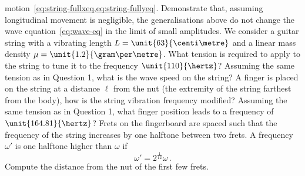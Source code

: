 \begin{ExerciseList}
  motion~\cref{eq:string-fullxeq,eq:string-fullyeq}.
  \Question Demonstrate that, assuming longitudinal movement is negligible, the
  generalisations above do not change the wave equation~\cref{eq:wave-eq} in the limit of
  small amplitudes.
  \Exercise[label=guitar] We consider a guitar string with a vibrating length
  $L=\unit{63}{\centi\metre}$ and a linear mass density $\mu=\unit{1.2}{\gram\per\metre}$.
  \Question What tension is required to apply to the string to tune it to the frequency
  $\unit{110}{\hertz}$? \Question Assuming the same tension as in Question 1, what is the
  wave speed on the string? \Question A finger is placed on the string at a distance
  $\ell$ from the nut (the extremity of the string farthest from the body), how is the
  string vibration frequency modified? \Question Assuming the same tension as in Question
  1, what finger position leads to a frequency of $\unit{164.81}{\hertz}$? \Question Frets
  on the fingerboard are spaced such that the frequency of the string increases by one
  halftone between two frets. A frequency $\omega'$ is one halftone higher than $\omega$
  if
  \begin{equation}
    \omega'=2^{\frac{1}{12}}\omega\,.
  \end{equation}
  Compute the distance from the nut of the first few frets.
\end{ExerciseList}
